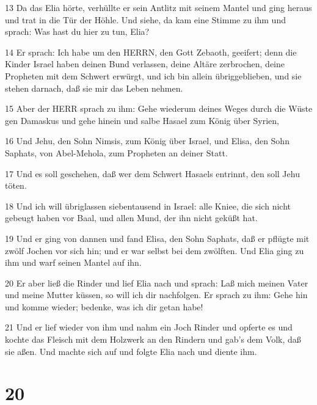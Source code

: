 \par 13 Da das Elia hörte, verhüllte er sein Antlitz mit seinem Mantel und ging heraus und trat in die Tür der Höhle. Und siehe, da kam eine Stimme zu ihm und sprach: Was hast du hier zu tun, Elia?
\par 14 Er sprach: Ich habe um den HERRN, den Gott Zebaoth, geeifert; denn die Kinder Israel haben deinen Bund verlassen, deine Altäre zerbrochen, deine Propheten mit dem Schwert erwürgt, und ich bin allein übriggeblieben, und sie stehen darnach, daß sie mir das Leben nehmen.
\par 15 Aber der HERR sprach zu ihm: Gehe wiederum deines Weges durch die Wüste gen Damaskus und gehe hinein und salbe Hasael zum König über Syrien,
\par 16 Und Jehu, den Sohn Nimsis, zum König über Israel, und Elisa, den Sohn Saphats, von Abel-Mehola, zum Propheten an deiner Statt.
\par 17 Und es soll geschehen, daß wer dem Schwert Hasaels entrinnt, den soll Jehu töten.
\par 18 Und ich will übriglassen siebentausend in Israel: alle Kniee, die sich nicht gebeugt haben vor Baal, und allen Mund, der ihn nicht geküßt hat.
\par 19 Und er ging von dannen und fand Elisa, den Sohn Saphats, daß er pflügte mit zwölf Jochen vor sich hin; und er war selbst bei dem zwölften. Und Elia ging zu ihm und warf seinen Mantel auf ihn.
\par 20 Er aber ließ die Rinder und lief Elia nach und sprach: Laß mich meinen Vater und meine Mutter küssen, so will ich dir nachfolgen. Er sprach zu ihm: Gehe hin und komme wieder; bedenke, was ich dir getan habe!
\par 21 Und er lief wieder von ihm und nahm ein Joch Rinder und opferte es und kochte das Fleisch mit dem Holzwerk an den Rindern und gab's dem Volk, daß sie aßen. Und machte sich auf und folgte Elia nach und diente ihm.

\chapter{20}

